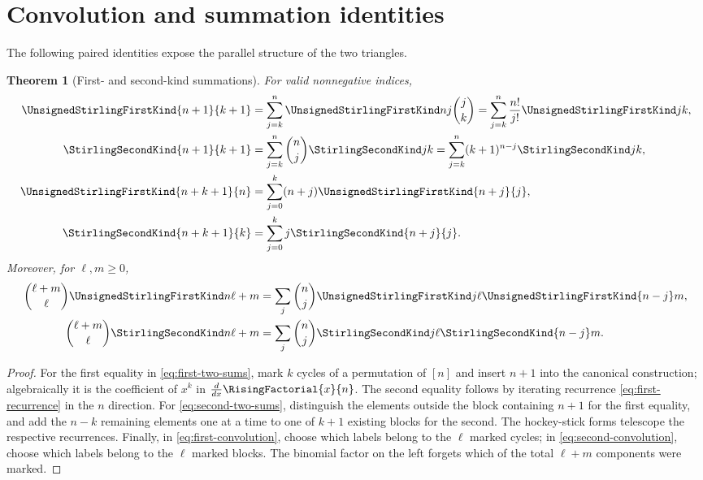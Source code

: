 \documentclass[11pt,a4paper,oneside,openany]{book}
\newtheorem{theorem}{Theorem}[chapter]
\theoremstyle{definition}
\theoremstyle{remark}
\begin{document}
\section{Convolution and summation identities}
The following paired identities expose the parallel structure of the two triangles.

\begin{theorem}[First- and second-kind summations]\label{thm:paired-sums}
For valid nonnegative indices,
\begin{align}
 \UnsignedStirlingFirstKind{n+1}{k+1}
   &=\sum_{j=k}^n\UnsignedStirlingFirstKind nj\binom jk
    =\sum_{j=k}^n\frac{n!}{j!}\UnsignedStirlingFirstKind jk,\label{eq:first-two-sums}\\
 \StirlingSecondKind{n+1}{k+1}
   &=\sum_{j=k}^n\binom nj\StirlingSecondKind jk
    =\sum_{j=k}^n(k+1)^{n-j}\StirlingSecondKind jk,\label{eq:second-two-sums}\\
 \UnsignedStirlingFirstKind{n+k+1}{n}
   &=\sum_{j=0}^k(n+j)\UnsignedStirlingFirstKind{n+j}{j},\label{eq:first-hockey}\\
 \StirlingSecondKind{n+k+1}{k}
   &=\sum_{j=0}^kj\StirlingSecondKind{n+j}{j}.\label{eq:second-hockey}
\end{align}
Moreover, for $\ell,m\ge0$,
\begin{align}
 \binom{\ell+m}{\ell}\UnsignedStirlingFirstKind n{\ell+m}
 &=\sum_j\binom nj\UnsignedStirlingFirstKind j\ell\UnsignedStirlingFirstKind{n-j}m,
 \label{eq:first-convolution}\\
 \binom{\ell+m}{\ell}\StirlingSecondKind n{\ell+m}
 &=\sum_j\binom nj\StirlingSecondKind j\ell\StirlingSecondKind{n-j}m.
 \label{eq:second-convolution}
\end{align}
\end{theorem}
\begin{proof}
For the first equality in \cref{eq:first-two-sums}, mark $k$ cycles of a permutation
of $[n]$ and insert $n+1$ into the canonical construction; algebraically it is the
coefficient of $x^k$ in $\frac{d}{dx}\RisingFactorial{x}{n}$.  The second equality follows by
iterating recurrence \cref{eq:first-recurrence} in the $n$ direction.  For
\cref{eq:second-two-sums}, distinguish the elements outside the block containing
$n+1$ for the first equality, and add the $n-k$ remaining elements one at a time to
one of $k+1$ existing blocks for the second.  The hockey-stick forms telescope the
respective recurrences.  Finally, in \cref{eq:first-convolution}, choose which labels
belong to the $\ell$ marked cycles; in \cref{eq:second-convolution}, choose which
labels belong to the $\ell$ marked blocks.  The binomial factor on the left forgets
which of the total $\ell+m$ components were marked.
\end{proof}
\end{document}
